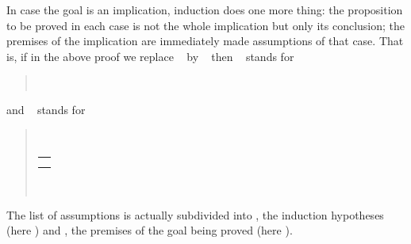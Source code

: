 \begin{isabellebody}
\begin{isamarkuptext}
In case the goal is an implication, induction does one more thing: the
proposition to be proved in each case is not the whole implication but only
its conclusion; the premises of the implication are immediately made
assumptions of that case. That is, if in the above proof we replace
~ by
\mbox{~}
then ~ stands for
\begin{quote}
 \ \\
 
\end{quote}
and ~ stands for
\begin{quote}
 \\
 
  \begin{tabular}[t]{l}\isa{{\isaliteral{22}{\isachardoublequote}}A{\isaliteral{28}{\isacharparenleft}}n{\isaliteral{29}{\isacharparenright}}\ {\isaliteral{5C3C4C6F6E6772696768746172726F773E}{\isasymLongrightarrow}}\ P{\isaliteral{28}{\isacharparenleft}}n{\isaliteral{29}{\isacharparenright}}{\isaliteral{22}{\isachardoublequote}}}\\\isa{{\isaliteral{22}{\isachardoublequote}}A{\isaliteral{28}{\isacharparenleft}}Suc\ n{\isaliteral{29}{\isacharparenright}}{\isaliteral{22}{\isachardoublequote}}}\end{tabular}\\
 
\end{quote}
The list of assumptions  is actually subdivided
into , the induction hypotheses (here )
and , the premises of the goal being proved
(here ).


\end{isamarkuptext}
\end{isabellebody}
